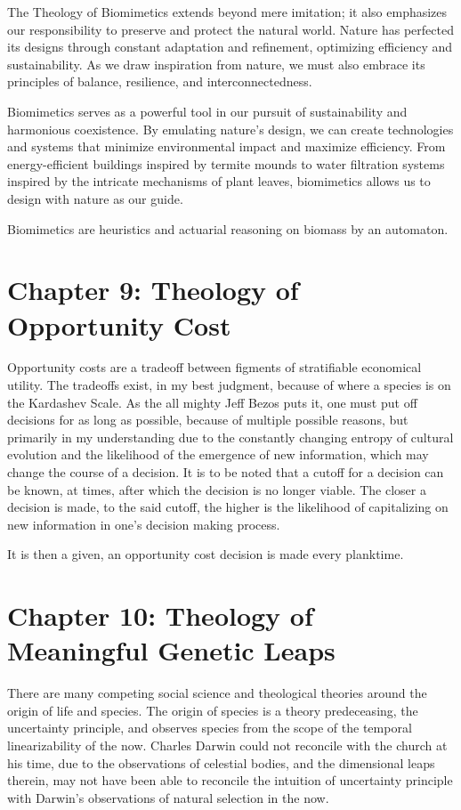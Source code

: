 \documentclass[ebook,12pt,oneside,openany]{memoir}
\begin{document}
\indent The Theology of Biomimetics extends beyond mere imitation; it also emphasizes our responsibility to preserve and protect the natural world. Nature has perfected its designs through constant adaptation and refinement, optimizing efficiency and sustainability. As we draw inspiration from nature, we must also embrace its principles of balance, resilience, and interconnectedness.

\indent Biomimetics serves as a powerful tool in our pursuit of sustainability and harmonious coexistence. By emulating nature's design, we can create technologies and systems that minimize environmental impact and maximize efficiency. From energy-efficient buildings inspired by termite mounds to water filtration systems inspired by the intricate mechanisms of plant leaves, biomimetics allows us to design with nature as our guide.

\indent Biomimetics are heuristics and actuarial reasoning on biomass by an automaton.
\chapter*{Chapter 9: Theology of Opportunity Cost}


\indent \indent Opportunity costs are a tradeoff between figments of stratifiable economical utility. The tradeoffs exist, in my best judgment, because of where a species is on the Kardashev Scale. As the all mighty Jeff Bezos puts it, one must put off decisions for as long as possible, because of multiple possible reasons, but primarily in my understanding due to the constantly changing entropy of cultural evolution and the likelihood of the emergence of new information, which may change the course of a decision. It is to be noted that a cutoff for a decision can be known, at times, after which the decision is no longer viable. The closer a decision is made, to the said cutoff, the higher is the likelihood of capitalizing on new information in one's decision making process.

\indent It is then a given, an opportunity cost decision is made every planktime.
\chapter*{Chapter 10: Theology of Meaningful Genetic Leaps}


\indent \indent There are many competing social science and theological theories around the origin of life and species. The origin of species is a theory predeceasing, the uncertainty principle, and observes species from the scope of the temporal linearizability of the now. Charles Darwin could not reconcile with the church at his time, due to the observations of celestial bodies, and the dimensional leaps therein, may not have been able to reconcile the intuition of uncertainty principle with Darwin’s observations of natural selection in the now.
\end{document}
